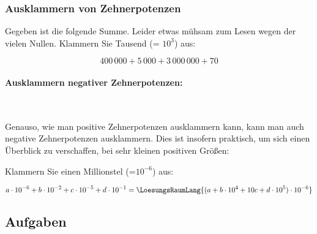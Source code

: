 

\newpage


\subsubsection{Ausklammern von Zehnerpotenzen}
Gegeben ist die folgende Summe. Leider etwas mühsam zum Lesen wegen der vielen Nullen. Klammern Sie Tausend (= $10^3$) aus:

$$400\,000 + 5\,000 + 3\,000\,000 + 70$$


\paragraph{Ausklammern negativer Zehnerpotenzen:}
\,

\vspace{1mm}

Genauso, wie man positive Zehnerpotenzen ausklammern kann, kann man auch negative Zehnerpotenzen ausklammern. Dies ist insofern praktisch, um sich einen Überblick zu verschaffen, bei sehr kleinen positiven Größen:

Klammern Sie einen Millionstel (=$10^{-6}$) aus:


$$a\cdot{}10^{-6} + b\cdot{}10^{-2} + c\cdot{}10^{-5} +
d\cdot{}10^{-1} = \LoesungsRaumLang{(a + b\cdot{}10^4 + 10c +
  d\cdot{}10^{5}) \cdot{} 10^{-6}}$$

\subsection*{Aufgaben}


\newpage

